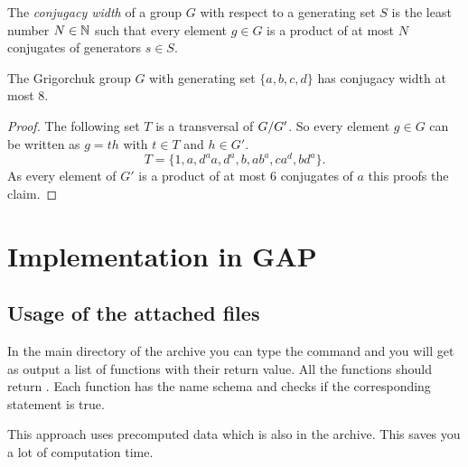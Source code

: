 \documentclass[a4paper,11pt]{amsart}
\begin{document}
\begin{defi}
 The \emph{conjugacy width} of a group $G$ with respect to a generating set $S$ 
 is the least number $N\in\mathbb{N}$ such that every element $g\in G$ is a product of
 at most $N$ conjugates of generators $s\in S$.
\end{defi}
\begin{cor}
 The Grigorchuk group $G$ with generating set $\{a,b,c,d\}$ has conjugacy width at most $8$.
\end{cor}
\begin{proof}
 The following set $T$ is a transversal of ${G/G'}$. So every element $g\in G$ can be written as $g=th$ with $t\in T$ and $h\in G'$.
 \[T=\{1,a,d^aa,d^a,b,ab^a,ca^d,bd^a\}.\]
 As every element of $G'$ is a product of at most $6$ conjugates of $a$ this proofs the claim.

\end{proof}


\section{Implementation in GAP}
\subsection{Usage of the attached files}
In the main directory of the archive you can type the command  and 
you will get as output a list of functions with their return value. All the functions should
return . Each function has the name schema  and checks
if the corresponding statement is true.

This approach uses precomputed data which is also in the archive. This saves you a lot of
computation time.
\end{document}

